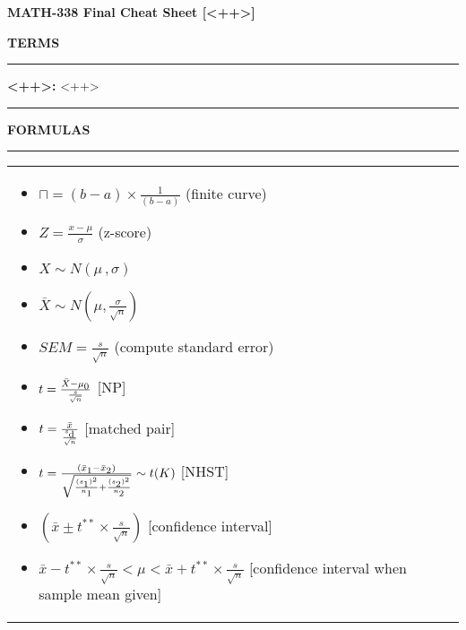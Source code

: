 \documentclass[6pt]{article}
\newcommand{\HL}{\par\noindent\rule{\textwidth}{0.4pt}}
\begin{document}
\begin{footnotesize}

\begin{center}
\textbf{MATH-338 Final Cheat Sheet [<++>]}
\end{center}

\textbf{TERMS}

\HL

\textbf{<++>:} <++>

\HL

\textbf{FORMULAS}

\HL

\begin{scriptsize}
\begin{tabular}{l | l}

\parbox{0.3\textwidth}{

\begin{itemize}
\setlength\itemsep{0.25em}
\item $\sqcap = (b-a) \times \frac{1}{(b-a)}$ (finite curve)
\item $Z = \frac{x - \mu}{\sigma}$ (z-score)
\item $X \sim N(\mu \, , \sigma)$
\item $\bar{X} \sim N(\mu, \frac{\sigma}{\sqrt{n}})$
\item $SEM = \frac{s}{\sqrt{n}}$ (compute standard error)
\item $t = \frac{\bar{X} - \mu\textsubscript{0}}{\frac{s}{\sqrt{n}}}$ [NP]

\item $t = \frac{\bar{x}}{\frac{s\textsubscript{d}}{\sqrt{n}}}$ [matched pair]

\item $t = \frac{(\bar{x}\textsubscript{1} - \bar{x}\textsubscript{2})}{\sqrt{\frac{(s\textsubscript{1})^2}{n\textsubscript{1}} +\frac{(s\textsubscript{2})^2}{n\textsubscript{2}}}} \sim t(K)$ [NHST]
\item $(\bar{x} \pm t^{\ast\ast} \times \frac{s}{\sqrt{n}})$ [confidence interval]
\item $\bar{x} - t^{\ast\ast} \times \frac{s}{\sqrt{n}} < \mu < \bar{x} + t^{\ast\ast} \times \frac{s}{\sqrt{n}}$ [confidence interval when sample mean given]
\end{itemize}

}

&


\end{tabular}
\end{scriptsize}
\end{footnotesize}
\end{document}

